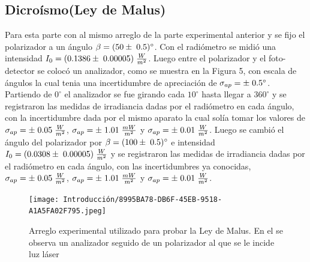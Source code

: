 \documentclass[DIV=calc, paper=a4, fontsize=10pt]{scrartcl}
\begin{document}
\subsection*{\textcolor{carmine}{Dicroísmo(Ley de Malus)}}
Para esta parte con al mismo arreglo de la parte experimental anterior y se fijo el polarizador a un ángulo $\beta=(50\pm\hspace{0.1cm}0.5)^{\circ}$. Con el radiómetro se midió una intensidad $I_{0}=(0.1386\pm\hspace{0.1cm}0.00005)\hspace{0.1cm}\frac{W}{m^{2}}$. Luego  entre el polarizador y el foto-detector se colocó un analizador, como se muestra en la Figura 5, con escala de ángulos la cual tenia una incertidumbre de apreciación de $\sigma_{ap}=\pm\hspace{0.1cm}0.5^{\circ}$. Partiendo de $0^{\circ}$ el analizador se fue girando cada $10^{\circ}$ hasta llegar a $360^{\circ}$ y se registraron las medidas de irradiancia dadas por el radiómetro en cada ángulo, con la incertidumbre dada por el mismo aparato la cual solía tomar los valores de  $\sigma_{ap}=\pm\hspace{0.1cm}0.05\hspace{0.1cm}\frac{W}{m^{2}}$, $\sigma_{ap}=\pm\hspace{0.1cm}1.01\hspace{0.1cm}\frac{mW}{m^{2}}$ y  
$\sigma_{ap}=\pm\hspace{0.1cm}0.01\hspace{0.1cm}\frac{W}{m^{2}}$. 
Luego se cambió el ángulo del polarizador por $\beta=(100\pm\hspace{0.1cm}0.5)^{\circ}$ e intensidad $I_{0}= (0.0308\pm\hspace{0.1cm}0.00005)\hspace{0.1cm}\frac{W}{m^{2}}$ y  se registraron las medidas de irradiancia dadas por el radiómetro en cada ángulo, con las incertidumbres ya conocidas, $\sigma_{ap}=\pm\hspace{0.1cm}0.05\hspace{0.1cm}\frac{W}{m^{2}}$, $\sigma_{ap}=\pm\hspace{0.1cm}1.01\hspace{0.1cm}\frac{mW}{m^{2}}$ y  
$\sigma_{ap}=\pm\hspace{0.1cm}0.01\hspace{0.1cm}\frac{W}{m^{2}}$. 
\begin{figure}[H]
    \centering
    \texttt{[image: Introducción/8995BA78-DB6F-45EB-9518-A1A5FA02F795.jpeg]}
    \caption{Arreglo experimental utilizado para probar la Ley de Malus. En el se observa un analizador seguido de un polarizador al que se le incide luz láser}
    \label{fig:my_label}
\end{figure}
\end{document}
